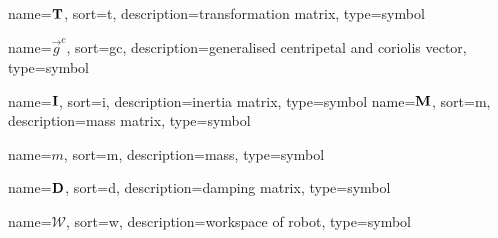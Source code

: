 	{%
		name=\ensuremath{\mat{T}},
		sort=t,
		description=transformation matrix,
		type=symbol
	}
	\newcommand{\transformationmat}{\gls{sym:transformationmat}}

	{%
		name=\ensuremath{\vec{g}^c},
		sort=gc,
		description=generalised centripetal and coriolis vector,
		type=symbol
	}
	\newcommand{\centripitalCoriolisVec}{\gls{sym:centripitalCoriolisVec}}

	{%
		name=\ensuremath{\mat{I}},
			sort=i,
			description=inertia matrix,
			type=symbol
		}
		\newcommand{\inertiamat}{\gls{sym:inertiamat}}
	{%
		name=\ensuremath{\mat{M}},
		sort=m,
		description=mass matrix,
		type=symbol
	}
	\newcommand{\massmat}{\gls{sym:massmat}}

	{%
		name=\ensuremath{m},
		sort=m,
		description=mass,
		type=symbol
	}
	\newcommand{\mass}{\gls{sym:mass}}

	{%
		name=\ensuremath{\mat{D}},
		sort=d,
		description=damping matrix,
		type=symbol
	}
	\newcommand{\dampingmat}{\gls{sym:dampingmat}}

	{%
		name=\ensuremath{\mathcal{W}},
		sort=w,
		description=workspace of robot,
		type=symbol
	}
	\newcommand{\workspace}{\gls{sym:workspace}}

